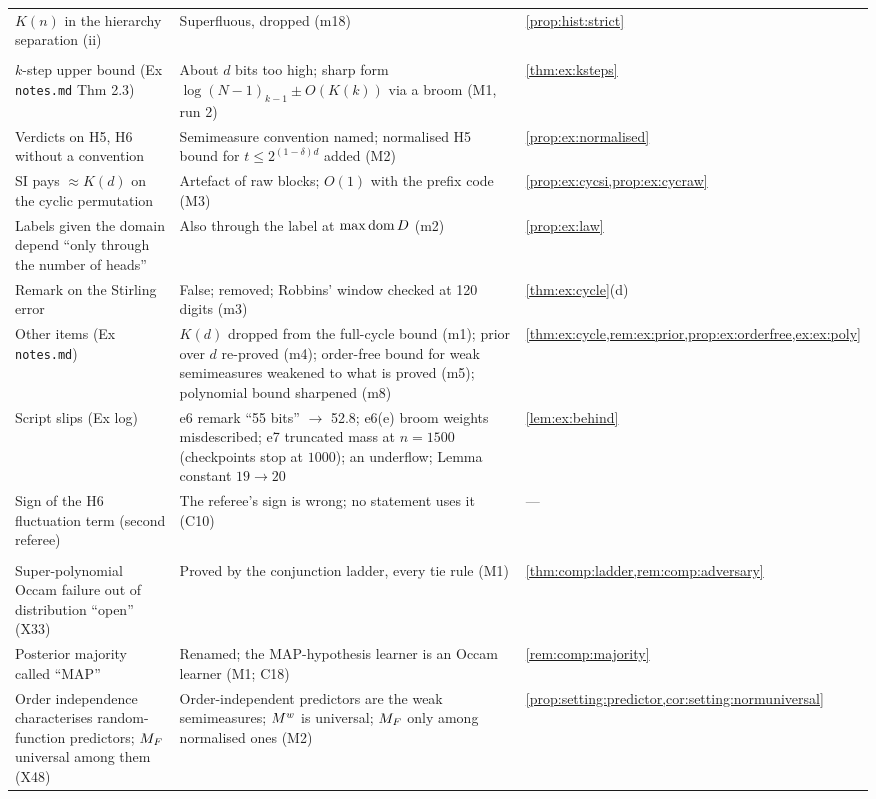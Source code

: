 {\begin{longtable}{@{}>{\raggedright\arraybackslash}p{5.1cm}>{\raggedright\arraybackslash}p{7.6cm}>{\raggedright\arraybackslash}p{2.6cm}@{}}
$K(n)$ in the hierarchy separation (ii) & Superfluous, dropped (m18) & \cref{prop:hist:strict}\\
\multicolumn{3}{@{}l}{\emph{Examples}}\\
$k$-step upper bound (Ex \texttt{notes.md} Thm 2.3) & About $d$ bits too high; sharp form $\log(N-1)_{k-1}\pm O(K(k))$ via a broom (M1, run 2) & \cref{thm:ex:ksteps}\\
Verdicts on H5, H6 without a convention & Semimeasure convention named; normalised H5 bound for $t\le2^{(1-\delta)d}$ added (M2) & \cref{prop:ex:normalised}\\
SI pays $\approx K(d)$ on the cyclic permutation & Artefact of raw blocks; $O(1)$ with the prefix code (M3) & \cref{prop:ex:cycsi,prop:ex:cycraw}\\
Labels given the domain depend ``only through the number of heads'' & Also through the label at $\max\operatorname{dom} D$ (m2) & \cref{prop:ex:law}\\
Remark on the Stirling error & False; removed; Robbins' window checked at 120 digits (m3) & \cref{thm:ex:cycle}(d)\\
Other items (Ex \texttt{notes.md}) & $K(d)$ dropped from the full-cycle bound (m1); prior over $d$ re-proved (m4); order-free bound for weak semimeasures weakened to what is proved (m5); polynomial bound sharpened (m8) & \cref{thm:ex:cycle,rem:ex:prior,prop:ex:orderfree,ex:ex:poly}\\
Script slips (Ex log) & e6 remark ``55 bits'' $\to$ 52.8; e6(e) broom weights misdescribed; e7 truncated mass at $n=1500$ (checkpoints stop at $1000$); an underflow; Lemma constant $19\to20$ & \cref{lem:ex:behind}\\
Sign of the H6 fluctuation term (second referee) & The referee's sign is wrong; no statement uses it (C10) & ---\\
\multicolumn{3}{@{}l}{\emph{Context}}\\
Super-polynomial Occam failure out of distribution ``open'' (X33) & Proved by the conjunction ladder, every tie rule (M1) & \cref{thm:comp:ladder,rem:comp:adversary}\\
Posterior majority called ``MAP'' & Renamed; the MAP-hypothesis learner is an Occam learner (M1; C18) & \cref{rem:comp:majority}\\
Order independence characterises random-function predictors; $M_{F}$ universal among them (X48) & Order-independent predictors are the weak semimeasures; $M^{w}$ is universal; $M_{F}$ only among normalised ones (M2) & \cref{prop:setting:predictor,cor:setting:normuniversal}\\

\end{longtable}}
